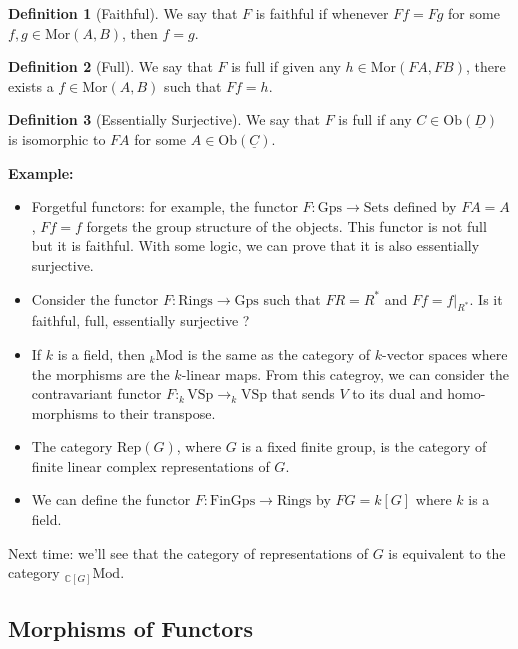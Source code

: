 \documentclass{article}
\theoremstyle{plain}
\theoremstyle{definition}
\newtheorem*{definition}{Definition}
\newcommand{\C}{\mathbb{C}}
\newenvironment{example}{\noindent\textbf{Example:} \vspace{-0.2cm}\begin{itemize}}{\end{itemize}}
\begin{document}
\begin{definition}[Faithful]
    We say that $F$ is faithful if whenever $Ff = Fg$ for some $f,g \in \text{Mor}(A,B)$, then $f = g$.
\end{definition}

\begin{definition}[Full]
    We say that $F$ is full if given any $h \in \text{Mor}(FA, FB)$, there exists a $f \in \text{Mor}(A,B)$ such that $Ff = h$.
\end{definition}

\begin{definition}[Essentially Surjective]
    We say that $F$ is full if any $C \in \text{Ob}(\underline{D})$ is isomorphic to $FA$ for some $A \in \text{Ob}(\underline{C})$.
\end{definition}

\begin{example}
    \item Forgetful functors: for example, the functor $F : \text{Gps} \to \text{Sets}$ defined by $FA = A$, $Ff = f$ forgets the group structure of the objects. This functor is not full but it is faithful. With some logic, we can prove that it is also essentially surjective.
    \item Consider the functor $F : \text{Rings} \to \text{Gps}$ such that $FR = R^*$ and $Ff = f|_{R^*}$. Is it faithful, full, essentially surjective ?
    \item If $k$ is a field, then ${}_k \text{Mod}$ is the same as the category of $k$-vector spaces where the morphisms are the $k$-linear maps. From this categroy, we can consider the contravariant functor $F : _k\text{VSp} \to _k\text{VSp}$ that sends $V$ to its dual and homo-morphisms to their transpose.
    \item The category $\text{Rep}(G)$, where $G$ is a fixed finite group, is the category of finite linear complex representations of $G$.
    \item We can define the functor $F : \text{FinGps} \to \text{Rings}$ by $FG = k[G]$ where $k$ is a field.
\end{example}

Next time: we'll see that the category of representations of $G$ is equivalent to the category ${}_{\C[G]}\text{Mod}$.

\subsection{Morphisms of Functors}
\end{document}
